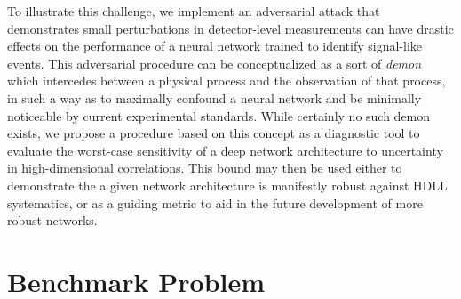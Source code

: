 \documentclass[reprint,nofootinbib,...]{revtex4-1}
\begin{document}

To illustrate this challenge, we implement an adversarial attack that demonstrates small perturbations in detector-level measurements can have drastic effects on the performance of a neural network trained to identify signal-like events.
This adversarial procedure can be conceptualized as a sort of \textit{demon}~\cite{TheLordKelvin} which intercedes between a physical process and the observation of that process, in such a way as to maximally confound a neural network and be minimally noticeable by current experimental standards.
While certainly no such demon exists, we propose a procedure based on this concept as a diagnostic tool to evaluate the worst-case sensitivity of a deep network architecture to uncertainty in high-dimensional correlations.
This bound may then be used either to demonstrate the a given network architecture is manifestly robust against HDLL systematics, or as a guiding metric to aid in the future development of more robust networks.

\section{Benchmark Problem}
\end{document}
